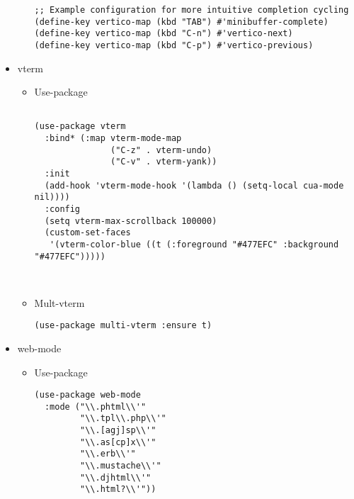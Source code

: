 \documentclass{article}
\begin{document}
\begin{itemize}
\begin{itemize}
\begin{verbatim}
;; Example configuration for more intuitive completion cycling
(define-key vertico-map (kbd "TAB") #'minibuffer-complete)
(define-key vertico-map (kbd "C-n") #'vertico-next)
(define-key vertico-map (kbd "C-p") #'vertico-previous)

\end{verbatim}
\end{itemize}
\item vterm
\label{sec:orgd513042}
\begin{itemize}
\item Use-package
\label{sec:orga2d654a}
\begin{verbatim}

(use-package vterm
  :bind* (:map vterm-mode-map
               ("C-z" . vterm-undo)
               ("C-v" . vterm-yank))
  :init
  (add-hook 'vterm-mode-hook '(lambda () (setq-local cua-mode nil))))
  :config
  (setq vterm-max-scrollback 100000)  
  (custom-set-faces
   '(vterm-color-blue ((t (:foreground "#477EFC" :background "#477EFC")))))



\end{verbatim}

\item Mult-vterm
\label{sec:org0c1416a}
\begin{verbatim}
(use-package multi-vterm :ensure t)
\end{verbatim}
\end{itemize}
\item web-mode
\label{sec:org5dc91ef}
\begin{itemize}
\item Use-package
\label{sec:org558dbef}
\begin{verbatim}
(use-package web-mode
  :mode ("\\.phtml\\'"
         "\\.tpl\\.php\\'"
         "\\.[agj]sp\\'"
         "\\.as[cp]x\\'"
         "\\.erb\\'"
         "\\.mustache\\'"
         "\\.djhtml\\'"
         "\\.html?\\'"))


\end{verbatim}
\end{itemize}
\end{itemize}
\end{document}
